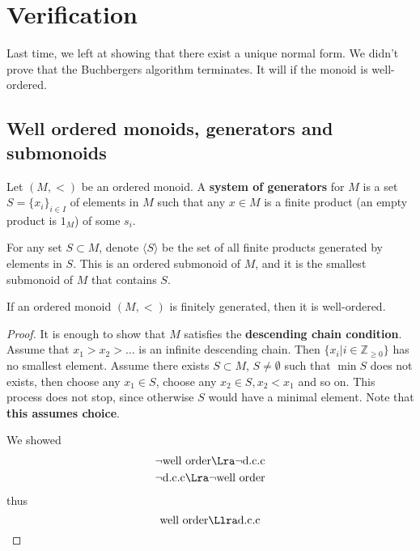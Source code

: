 \section{Verification}

Last time, we left at showing that there exist a unique normal form.
We didn't prove that the Buchbergers algorithm terminates. It will
if the monoid is well-ordered.

\subsection{Well ordered monoids, generators and submonoids}
Let $(M, <)$ be an ordered monoid. A \textbf{system of generators} for $M$
is a set $S = \{x_i\}_{i\in I}$ of elements in $M$ such that 
any $x\in M$ is a finite product (an empty product is $1_M$)
of some $s_i$. 

For any set $S\subset M$, denote $\langle S \rangle$ be the set 
of all finite products generated by elements in $S$. This is 
an ordered submonoid of $M$, and it is the smallest submonoid of $M$
that contains $S$.

\begin{Theorem}
    \label{thm:ordered-monoid}
    If an ordered monoid $(M, <)$ is finitely generated, then it is 
    well-ordered.
\end{Theorem}

\begin{proof}
It is enough to show that $M$ satisfies the \textbf{descending chain condition}.
Assume that $x_1 > x_2 > \ldots$ is an infinite descending chain.
Then $\{x_i| i \in \mathbb{Z}_{\geq 0}\}$ has no smallest element.
Assume there exists $S\subset M$, $S\neq \emptyset$ such that $\min S$ does not exists,
then choose any $x_1 \in S$, choose any $x_2 \in S, x_2 < x_1$ and so on.
This process does not stop, since otherwise $S$ would have a minimal element.
Note that \textbf{this assumes choice}.

We showed 
\begin{eqnarray*}
    \neg\text{well order} \Lra \neg\text{d.c.c} \\
    \neg\text{d.c.c} \Lra \neg\text{well order}
\end{eqnarray*}
thus 
\[\text{well order} \Llra \text{d.c.c}\]
\end{proof}

